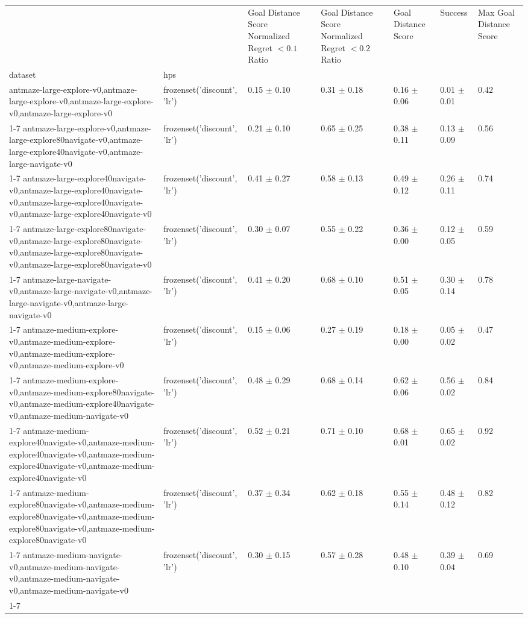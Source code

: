 \begin{tabular}{lllllll}
\toprule
 &  & Goal Distance Score Normalized Regret $< 0.1$ Ratio & Goal Distance Score Normalized Regret $< 0.2$ Ratio & Goal Distance Score & Success & Max Goal Distance Score \\
dataset & hps &  &  &  &  &  \\
\midrule
antmaze-large-explore-v0,antmaze-large-explore-v0,antmaze-large-explore-v0,antmaze-large-explore-v0 & frozenset({'discount', 'lr'}) & 0.15 $\pm$ 0.10 & 0.31 $\pm$ 0.18 & 0.16 $\pm$ 0.06 & 0.01 $\pm$ 0.01 & 0.42 \\
\cline{1-7}
antmaze-large-explore-v0,antmaze-large-explore80navigate-v0,antmaze-large-explore40navigate-v0,antmaze-large-navigate-v0 & frozenset({'discount', 'lr'}) & 0.21 $\pm$ 0.10 & 0.65 $\pm$ 0.25 & 0.38 $\pm$ 0.11 & 0.13 $\pm$ 0.09 & 0.56 \\
\cline{1-7}
antmaze-large-explore40navigate-v0,antmaze-large-explore40navigate-v0,antmaze-large-explore40navigate-v0,antmaze-large-explore40navigate-v0 & frozenset({'discount', 'lr'}) & 0.41 $\pm$ 0.27 & 0.58 $\pm$ 0.13 & 0.49 $\pm$ 0.12 & 0.26 $\pm$ 0.11 & 0.74 \\
\cline{1-7}
antmaze-large-explore80navigate-v0,antmaze-large-explore80navigate-v0,antmaze-large-explore80navigate-v0,antmaze-large-explore80navigate-v0 & frozenset({'discount', 'lr'}) & 0.30 $\pm$ 0.07 & 0.55 $\pm$ 0.22 & 0.36 $\pm$ 0.00 & 0.12 $\pm$ 0.05 & 0.59 \\
\cline{1-7}
antmaze-large-navigate-v0,antmaze-large-navigate-v0,antmaze-large-navigate-v0,antmaze-large-navigate-v0 & frozenset({'discount', 'lr'}) & 0.41 $\pm$ 0.20 & 0.68 $\pm$ 0.10 & 0.51 $\pm$ 0.05 & 0.30 $\pm$ 0.14 & 0.78 \\
\cline{1-7}
antmaze-medium-explore-v0,antmaze-medium-explore-v0,antmaze-medium-explore-v0,antmaze-medium-explore-v0 & frozenset({'discount', 'lr'}) & 0.15 $\pm$ 0.06 & 0.27 $\pm$ 0.19 & 0.18 $\pm$ 0.00 & 0.05 $\pm$ 0.02 & 0.47 \\
\cline{1-7}
antmaze-medium-explore-v0,antmaze-medium-explore80navigate-v0,antmaze-medium-explore40navigate-v0,antmaze-medium-navigate-v0 & frozenset({'discount', 'lr'}) & 0.48 $\pm$ 0.29 & 0.68 $\pm$ 0.14 & 0.62 $\pm$ 0.06 & 0.56 $\pm$ 0.02 & 0.84 \\
\cline{1-7}
antmaze-medium-explore40navigate-v0,antmaze-medium-explore40navigate-v0,antmaze-medium-explore40navigate-v0,antmaze-medium-explore40navigate-v0 & frozenset({'discount', 'lr'}) & 0.52 $\pm$ 0.21 & 0.71 $\pm$ 0.10 & 0.68 $\pm$ 0.01 & 0.65 $\pm$ 0.02 & 0.92 \\
\cline{1-7}
antmaze-medium-explore80navigate-v0,antmaze-medium-explore80navigate-v0,antmaze-medium-explore80navigate-v0,antmaze-medium-explore80navigate-v0 & frozenset({'discount', 'lr'}) & 0.37 $\pm$ 0.34 & 0.62 $\pm$ 0.18 & 0.55 $\pm$ 0.14 & 0.48 $\pm$ 0.12 & 0.82 \\
\cline{1-7}
antmaze-medium-navigate-v0,antmaze-medium-navigate-v0,antmaze-medium-navigate-v0,antmaze-medium-navigate-v0 & frozenset({'discount', 'lr'}) & 0.30 $\pm$ 0.15 & 0.57 $\pm$ 0.28 & 0.48 $\pm$ 0.10 & 0.39 $\pm$ 0.04 & 0.69 \\
\cline{1-7}
\bottomrule
\end{tabular}
